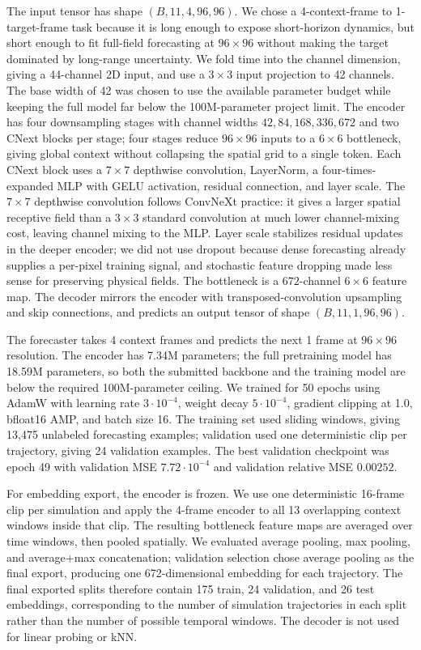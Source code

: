 \documentclass{article}
\begin{document}
The input tensor has shape $(B,11,4,96,96)$. We chose a 4-context-frame to 1-target-frame task because it is long enough to expose short-horizon dynamics, but short enough to fit full-field forecasting at $96\times96$ without making the target dominated by long-range uncertainty. We fold time into the channel dimension, giving a 44-channel 2D input, and use a $3\times3$ input projection to 42 channels. The base width of 42 was chosen to use the available parameter budget while keeping the full model far below the 100M-parameter project limit. The encoder has four downsampling stages with channel widths $42,84,168,336,672$ and two CNext blocks per stage; four stages reduce $96\times96$ inputs to a $6\times6$ bottleneck, giving global context without collapsing the spatial grid to a single token. Each CNext block uses a $7\times7$ depthwise convolution, LayerNorm, a four-times-expanded MLP with GELU activation, residual connection, and layer scale. The $7\times7$ depthwise convolution follows ConvNeXt practice: it gives a larger spatial receptive field than a $3\times3$ standard convolution at much lower channel-mixing cost, leaving channel mixing to the MLP. Layer scale stabilizes residual updates in the deeper encoder; we did not use dropout because dense forecasting already supplies a per-pixel training signal, and stochastic feature dropping made less sense for preserving physical fields. The bottleneck is a $672$-channel $6\times6$ feature map. The decoder mirrors the encoder with transposed-convolution upsampling and skip connections, and predicts an output tensor of shape $(B,11,1,96,96)$.

The forecaster takes 4 context frames and predicts the next 1 frame at $96\times96$ resolution. The encoder has 7.34M parameters; the full pretraining model has 18.59M parameters, so both the submitted backbone and the training model are below the required 100M-parameter ceiling. We trained for 50 epochs using AdamW with learning rate $3\cdot10^{-4}$, weight decay $5\cdot10^{-4}$, gradient clipping at 1.0, bfloat16 AMP, and batch size 16. The training set used sliding windows, giving 13,475 unlabeled forecasting examples; validation used one deterministic clip per trajectory, giving 24 validation examples. The best validation checkpoint was epoch 49 with validation MSE $7.72\cdot10^{-4}$ and validation relative MSE $0.00252$.

For embedding export, the encoder is frozen. We use one deterministic 16-frame clip per simulation and apply the 4-frame encoder to all 13 overlapping context windows inside that clip. The resulting bottleneck feature maps are averaged over time windows, then pooled spatially. We evaluated average pooling, max pooling, and average+max concatenation; validation selection chose average pooling as the final export, producing one 672-dimensional embedding for each trajectory. The final exported splits therefore contain 175 train, 24 validation, and 26 test embeddings, corresponding to the number of simulation trajectories in each split rather than the number of possible temporal windows. The decoder is not used for linear probing or kNN.
\end{document}
